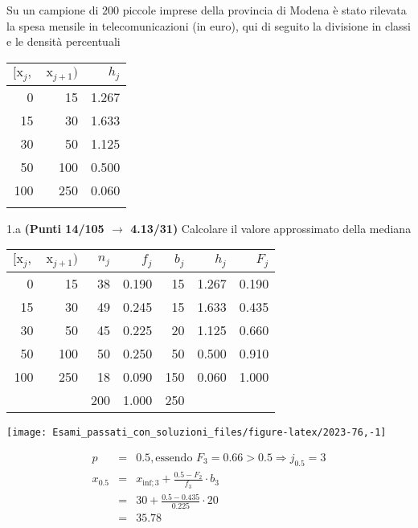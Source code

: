 \documentclass[
  11pt,
]{book}
\theoremstyle{mytheoremstyle}
\theoremstyle{mydefstyle}
\newenvironment{sol}
  {
  \begin{tcolorbox}[enhanced,breakable,arc=0.1mm,boxrule=1pt,colback=white,colframe=iblue,
  title=\bf \fontfamily{lmss}\selectfont \hspace{.5 cm} Soluzione,drop fuzzy shadow]

}{
\end{tcolorbox}
  }
\begin{document}
Su un campione di \(200\) piccole imprese della provincia di Modena è stato rilevata la spesa mensile in telecomunicazioni (in euro), qui di seguito
la divisione in classi e le densità percentuali

\begin{table}[H]
\centering
\begin{tabular}{rrr}
\toprule
$[\text{x}_j,$ & $\text{x}_{j+1})$ & $h_j$\\
\midrule
0 & 15 & 1.267\\
15 & 30 & 1.633\\
30 & 50 & 1.125\\
50 & 100 & 0.500\\
100 & 250 & 0.060\\
 &  & \\
\bottomrule
\end{tabular}
\end{table}

1.a \textbf{(Punti 14/105 \(\rightarrow\) 4.13/31)} Calcolare il valore approssimato della mediana

\begin{sol}

\begin{table}[H]
\centering
\begin{tabular}{rrrrrrr}
\toprule
$[\text{x}_j,$ & $\text{x}_{j+1})$ & $n_j$ & $f_j$ & $b_j$ & $h_j$ & $F_j$\\
\midrule
0 & 15 & 38 & 0.190 & 15 & 1.267 & 0.190\\
15 & 30 & 49 & 0.245 & 15 & 1.633 & 0.435\\
30 & 50 & 45 & 0.225 & 20 & 1.125 & 0.660\\
50 & 100 & 50 & 0.250 & 50 & 0.500 & 0.910\\
100 & 250 & 18 & 0.090 & 150 & 0.060 & 1.000\\
 &  & 200 & 1.000 & 250 &  & \\
\bottomrule
\end{tabular}
\end{table}

\begin{center}\texttt{[image: Esami\_passati\_con\_soluzioni\_files/figure-latex/2023-76,-1]} \end{center}

\begin{eqnarray*}
  p &=&  0.5 , \text{essendo }F_{ 3 }= 0.66  > 0.5  \Rightarrow j_{ 0.5 }= 3 \\
  x_{ 0.5 } &=& x_{\text{inf}; 3 } + \frac{ { 0.5 } - F_{ 2 }} {f_{ 3 }} \cdot b_{ 3 } \\
            &=&  30  + \frac {{ 0.5 } -  0.435 } { 0.225 } \cdot  20  \\
            &=&  35.78 
\end{eqnarray*}

\end{sol}
\end{document}
